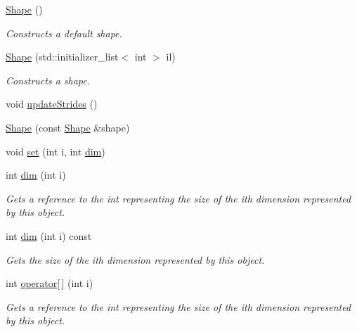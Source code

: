\begin{DoxyCompactItemize}
\item 
\hyperlink{structmarian_1_1Shape_a5d3976a7b93ffeb26bcb4fd020760f6f}{Shape} ()
\begin{DoxyCompactList}\small\item\em Constructs a default shape. \end{DoxyCompactList}\item 
\hyperlink{structmarian_1_1Shape_adb8f3c0ab0efd3ca4253d5d7e998b9cc}{Shape} (std\+::initializer\+\_\+list$<$ int $>$ il)
\begin{DoxyCompactList}\small\item\em Constructs a shape. \end{DoxyCompactList}\item 
void \hyperlink{structmarian_1_1Shape_a9cf031011a4b53538dda070a77ad19f9}{update\+Strides} ()
\item 
\hyperlink{structmarian_1_1Shape_a5b79f3dd7ab6441b2b2bffdd07eba8a3}{Shape} (const \hyperlink{structmarian_1_1Shape}{Shape} \&shape)
\item 
void \hyperlink{structmarian_1_1Shape_a2849bb218aa2214bbab47256a9452caf}{set} (int i, int \hyperlink{structmarian_1_1Shape_af416da295388777386ae8b834115066f}{dim})
\item 
int \hyperlink{structmarian_1_1Shape_af416da295388777386ae8b834115066f}{dim} (int i)
\begin{DoxyCompactList}\small\item\em Gets a reference to the int representing the size of the {\ttfamily i}th dimension represented by this object. \end{DoxyCompactList}\item 
int \hyperlink{structmarian_1_1Shape_aca204099494ae601fddeb4be4bc3f189}{dim} (int i) const 
\begin{DoxyCompactList}\small\item\em Gets the size of the {\ttfamily i}th dimension represented by this object. \end{DoxyCompactList}\item 
int \hyperlink{structmarian_1_1Shape_a08ec40e4c6a6236f8392d3328a40c8cc}{operator\mbox{[}$\,$\mbox{]}} (int i)
\begin{DoxyCompactList}\small\item\em Gets a reference to the int representing the size of the {\ttfamily i}th dimension represented by this object. \end{DoxyCompactList}\item 

\end{DoxyCompactItemize}
